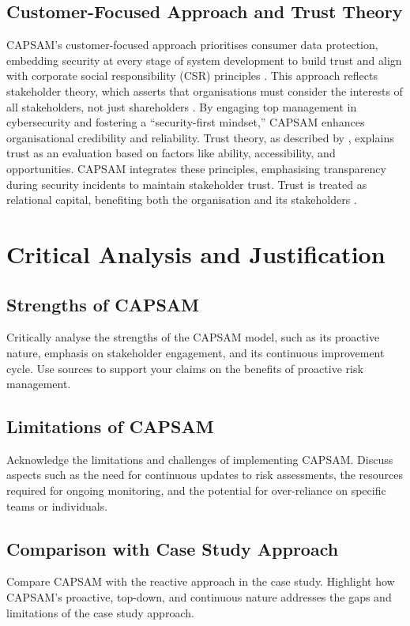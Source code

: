     \subsection{Customer-Focused Approach and Trust Theory}
    CAPSAM's customer-focused approach prioritises consumer data protection, embedding security at every stage of system development to build trust and align with corporate social responsibility (CSR) principles \citep{moir2001csr}. This approach reflects stakeholder theory, which asserts that organisations must consider the interests of all stakeholders, not just shareholders \citep{parmar2010stakeholder}. By engaging top management in cybersecurity and fostering a “security-first mindset,” CAPSAM enhances organisational credibility and reliability. Trust theory, as described by \citet{castelfranchi2010trust}, explains trust as an evaluation based on factors like ability, accessibility, and opportunities. CAPSAM integrates these principles, emphasising transparency during security incidents to maintain stakeholder trust. Trust is treated as relational capital, benefiting both the organisation and its stakeholders \citep{castelfranchi2010trust}.
    

\section{Critical Analysis and Justification}
    \subsection{Strengths of CAPSAM}
    Critically analyse the strengths of the CAPSAM model, such as its proactive nature, emphasis on stakeholder engagement, and its continuous improvement cycle. Use sources to support your claims on the benefits of proactive risk management.

    \subsection{Limitations of CAPSAM}
    Acknowledge the limitations and challenges of implementing CAPSAM. Discuss aspects such as the need for continuous updates to risk assessments, the resources required for ongoing monitoring, and the potential for over-reliance on specific teams or individuals.

    \subsection{Comparison with Case Study Approach}
    Compare CAPSAM with the reactive approach in the case study. Highlight how CAPSAM's proactive, top-down, and continuous nature addresses the gaps and limitations of the case study approach.

